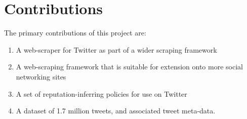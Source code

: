 \section{Contributions}
The primary contributions of this project are:

\begin{enumerate}
	\item A web-scraper for Twitter as part of a wider scraping framework
	\item A web-scraping framework that is suitable for extension onto more social networking sites
	\item A set of reputation-inferring policies for use on Twitter 
	\item A dataset of 1.7 million tweets, and associated tweet meta-data.
\end{enumerate}



